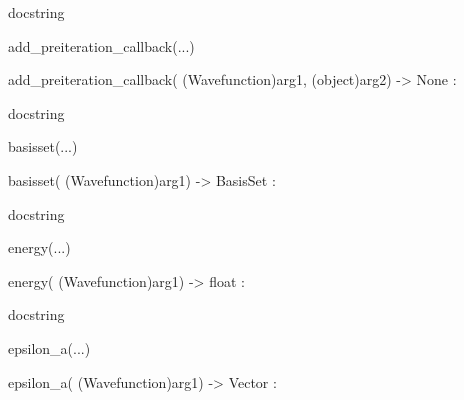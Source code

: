 \documentclass[letterpaper,10pt,english]{sphinxmanual}
\begin{document}
\begin{description}
\begin{description}
\begin{DUlineblock}{0em}
\begin{DUlineblock}{\DUlineblockindent}
\begin{DUlineblock}{\DUlineblockindent}
\item[] docstring
\item[] 
\end{DUlineblock}
\end{DUlineblock}
\item[] add\_preiteration\_callback(...)
\item[]
\begin{DUlineblock}{\DUlineblockindent}
\item[] add\_preiteration\_callback( (Wavefunction)arg1, (object)arg2) -\textgreater{} None :
\item[]
\begin{DUlineblock}{\DUlineblockindent}
\item[] docstring
\item[] 
\end{DUlineblock}
\end{DUlineblock}
\item[] basisset(...)
\item[]
\begin{DUlineblock}{\DUlineblockindent}
\item[] basisset( (Wavefunction)arg1) -\textgreater{} BasisSet :
\item[]
\begin{DUlineblock}{\DUlineblockindent}
\item[] docstring
\item[] 
\end{DUlineblock}
\end{DUlineblock}
\item[] energy(...)
\item[]
\begin{DUlineblock}{\DUlineblockindent}
\item[] energy( (Wavefunction)arg1) -\textgreater{} float :
\item[]
\begin{DUlineblock}{\DUlineblockindent}
\item[] docstring
\item[] 
\end{DUlineblock}
\end{DUlineblock}
\item[] epsilon\_a(...)
\item[]
\begin{DUlineblock}{\DUlineblockindent}
\item[] epsilon\_a( (Wavefunction)arg1) -\textgreater{} Vector :
\item[]

\end{DUlineblock}
\end{DUlineblock}
\end{description}
\end{description}
\end{document}
